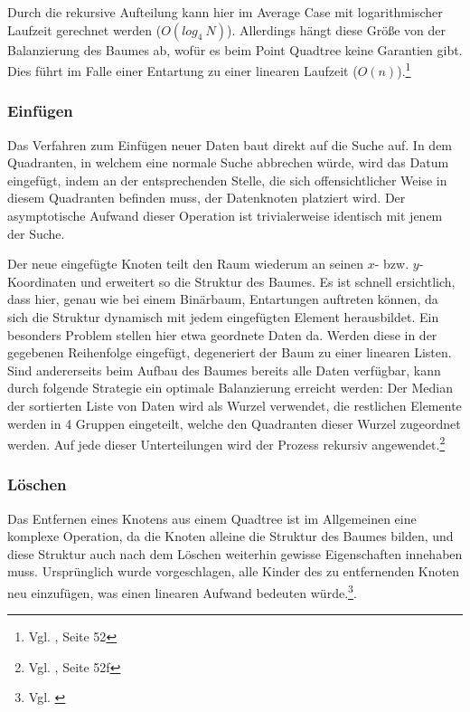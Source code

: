 \documentclass[%
			paper=a4,%
			DIV12,
			draft=false,%
			titlepage
			]{scrartcl}
\newcommand{\zit}[3]{#1 \cite{#2}, #3}
\newcommand{\zitx}[2]{#1 \cite{#2}}
\newcommand{\footzit}[3]{\footnote{\zit{#1}{#2}{#3}}}
\newcommand{\footzitx}[2]{\footnote{\zitx{#1}{#2}}}
\begin{document}
Durch die rekursive Aufteilung kann hier im Average Case mit logarithmischer Laufzeit gerechnet werden ($O(log_4\ N)$).
Allerdings hängt diese Größe von der Balanzierung des Baumes ab, wofür es beim Point Quadtree keine Garantien gibt. Dies führt im Falle einer Entartung zu einer linearen Laufzeit ($O(n)$).\footzit{Vgl.}{Samet90}{Seite 52}


\subsubsection{Einfügen}
\label{sec:pointquadtree:insert}
Das Verfahren zum Einfügen neuer Daten baut direkt auf die Suche auf.
In dem Quadranten, in welchem eine normale Suche abbrechen würde, wird das Datum eingefügt, indem an der entsprechenden Stelle, die sich offensichtlicher Weise in diesem Quadranten befinden muss, der Datenknoten platziert wird.
Der asymptotische Aufwand dieser Operation ist trivialerweise identisch mit jenem der Suche.

Der neue eingefügte Knoten teilt den Raum wiederum an seinen $x$- bzw. $y$-Koordinaten und erweitert so die Struktur des Baumes.  
Es ist schnell ersichtlich, dass hier, genau wie bei einem Binärbaum, Entartungen auftreten können, da sich die Struktur dynamisch mit jedem eingefügten Element herausbildet. 
Ein besonders Problem stellen hier etwa geordnete Daten da. Werden diese in der gegebenen Reihenfolge eingefügt, degeneriert der Baum zu einer linearen Listen. Sind andererseits beim Aufbau des Baumes bereits alle Daten verfügbar, kann durch folgende Strategie ein optimale Balanzierung erreicht werden: Der Median der sortierten Liste von Daten wird als Wurzel verwendet, die restlichen Elemente werden in 4 Gruppen eingeteilt, welche den Quadranten dieser Wurzel zugeordnet werden. Auf jede dieser Unterteilungen wird der Prozess rekursiv angewendet.\footzit{Vgl.}{Samet90}{Seite 52f}

\subsubsection{Löschen}
Das Entfernen eines Knotens aus einem Quadtree ist im Allgemeinen eine komplexe Operation, da die Knoten alleine die Struktur des Baumes bilden, und diese Struktur auch nach dem Löschen weiterhin gewisse Eigenschaften innehaben muss. Ursprünglich wurde vorgeschlagen, alle Kinder des zu entfernenden Knoten neu einzufügen, was einen linearen Aufwand bedeuten würde.\footzitx{Vgl.}{DBLP:journals/acta/FinkelB74}.
\end{document}
